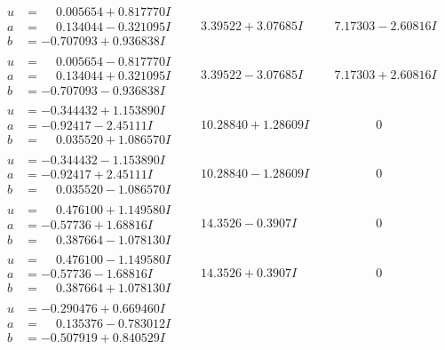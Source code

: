 \documentclass[1p]{elsarticle_modified}
\theoremstyle{definition}
\begin{document}
$$\begin{array}{c|c|c}
\begin{aligned}
u &= \phantom{-}0.005654 + 0.817770 I \\
a &= \phantom{-}0.134044 - 0.321095 I \\
b &= -0.707093 + 0.936838 I\end{aligned}
 & \phantom{-}3.39522 + 3.07685 I & \phantom{-}7.17303 - 2.60816 I \\ \hline\begin{aligned}
u &= \phantom{-}0.005654 - 0.817770 I \\
a &= \phantom{-}0.134044 + 0.321095 I \\
b &= -0.707093 - 0.936838 I\end{aligned}
 & \phantom{-}3.39522 - 3.07685 I & \phantom{-}7.17303 + 2.60816 I \\ \hline\begin{aligned}
u &= -0.344432 + 1.153890 I \\
a &= -0.92417 - 2.45111 I \\
b &= \phantom{-}0.035520 + 1.086570 I\end{aligned}
 & \phantom{-}10.28840 + 1.28609 I & \phantom{-0.000000 } 0 \\ \hline\begin{aligned}
u &= -0.344432 - 1.153890 I \\
a &= -0.92417 + 2.45111 I \\
b &= \phantom{-}0.035520 - 1.086570 I\end{aligned}
 & \phantom{-}10.28840 - 1.28609 I & \phantom{-0.000000 } 0 \\ \hline\begin{aligned}
u &= \phantom{-}0.476100 + 1.149580 I \\
a &= -0.57736 + 1.68816 I \\
b &= \phantom{-}0.387664 - 1.078130 I\end{aligned}
 & \phantom{-}14.3526 - 0.3907 I & \phantom{-0.000000 } 0 \\ \hline\begin{aligned}
u &= \phantom{-}0.476100 - 1.149580 I \\
a &= -0.57736 - 1.68816 I \\
b &= \phantom{-}0.387664 + 1.078130 I\end{aligned}
 & \phantom{-}14.3526 + 0.3907 I & \phantom{-0.000000 } 0 \\ \hline\begin{aligned}
u &= -0.290476 + 0.669460 I \\
a &= \phantom{-}0.135376 - 0.783012 I \\
b &= -0.507919 + 0.840529 I\end{aligned}

\end{array}$$
\end{document}
